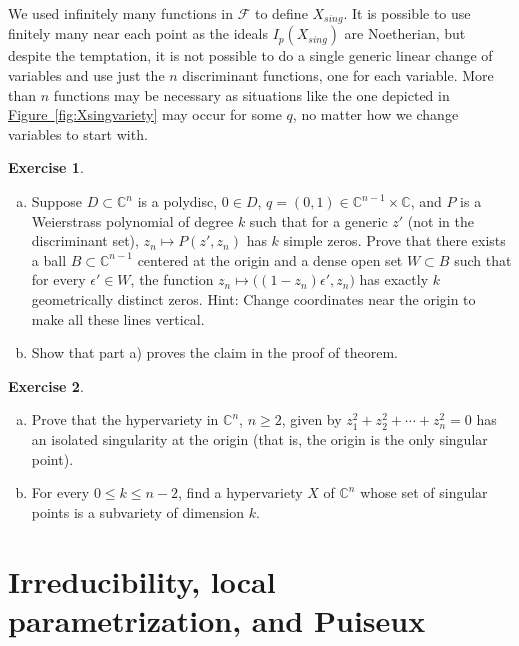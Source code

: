 \documentclass[12pt,openany]{book}
\newcommand{\C}{{\mathbb{C}}}
\newcommand{\sF}{{\mathscr{F}}}
\theoremstyle{plain}
\theoremstyle{remark}
\theoremstyle{definition}
\newenvironment{exbox}{%
    \def\FrameCommand{\vrule width 1pt \relax\hspace{10pt}}%
    \MakeFramed{\advance\hsize-\width\FrameRestore}%
}{%
    \endMakeFramed
}
\newenvironment{exparts}{%
    \leavevmode\begin{enumerate}[a),noitemsep,topsep=0pt,parsep=0pt,partopsep=0pt]
}{%
    \end{enumerate}
}
\theoremstyle{exercise}
\newtheorem{exercise}{Exercise}[section]
\theoremstyle{example}
\newcommand{\figureref}[1]{\hyperref[#1]{Figure~\ref*{#1}}}
\begin{document}
\pagebreak[2]
We used infinitely many functions in $\sF$ to define
$X_{\mathit{sing}}$.  It is possible to use finitely many near each point
as the ideals $I_p(X_{\mathit{sing}})$ are Noetherian,
but despite the temptation, it is not possible to do a single
generic linear change of variables and use just the
$n$ discriminant functions, one for each variable.
More than $n$ functions
may be necessary as situations like the one depicted in
\figureref{fig:Xsingvariety} may occur for some $q$,
no matter how we change
variables to start with.

\begin{exbox}
\begin{exercise} \label{exercise:nonverticalintersections}
\begin{exparts}
\item
Suppose $D \subset \C^n$ is a polydisc, $0 \in D$,
$q = (0,1) \in \C^{n-1} \times \C$,
and $P$ is a Weierstrass polynomial of degree $k$
such that for a generic $z'$ (not in the discriminant set),
$z_n \mapsto P(z',z_n)$ has $k$ simple zeros.
Prove that there exists a ball $B \subset \C^{n-1}$ centered at the origin
and a dense open set $W \subset B$
such that
for every $\epsilon' \in W$, the function
$z_n \mapsto \bigl( (1-z_n) \epsilon' , z_n \bigr)$
has exactly $k$ geometrically distinct zeros.
Hint: Change coordinates near the origin to make all these lines vertical.
\item
Show that part a) proves the claim in the proof of theorem.
\end{exparts}
\end{exercise}

\begin{exercise} \label{exercise:morsesingularity}
\pagebreak[2]
\begin{exparts}
\item
Prove that the hypervariety in $\C^n$, $n \geq 2$, given by $z_1^2 + z_2^2 + \cdots + z_n^2 = 0$
has an isolated singularity at the origin (that is, the origin is the only
singular point).
\item
For every $0 \leq k \leq n-2$, find a hypervariety $X$ of $\C^n$ whose set
of singular points is a subvariety of dimension $k$.
\end{exparts}
\end{exercise}
\end{exbox}

\section{Irreducibility, local parametrization, and Puiseux}
\end{document}

